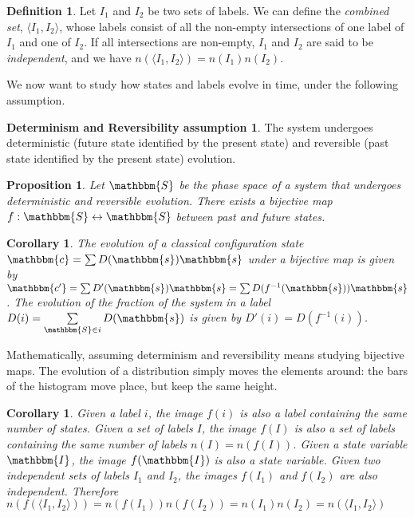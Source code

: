 \documentclass[aps,pra,10pt,twocolumn,floatfix,nofootinbib]{revtex4-1}
\newtheorem{cor}[thm]{Corollary}
\newtheorem{prop}[thm]{Proposition}
\theoremstyle{definition}
\newtheorem{defn}[thm]{Definition}
\newtheorem*{assump2}{Determinism and Reversibility assumption}
\begin{document}
\begin{defn}\label{labelsCombine}
Let $I_1$ and $I_2$ be two sets of labels. We can define the \emph{combined set}, $\langle I_1, I_2 \rangle$, whose labels consist of all the non-empty intersections of one label of $I_1$ and one of $I_2$. If all intersections are non-empty, $I_1$ and $I_2$ are said to be \emph{independent}, and we have $n(\langle I_1, I_2 \rangle)=n(I_1)n(I_2)$.
\end{defn}

We now want to study how states and labels evolve in time, under the following assumption.

\begin{assump2}
The system undergoes deterministic (future state identified by the present state) and reversible (past state identified by the present state) evolution.
\end{assump2}

\begin{prop}\label{detrevMap}
Let $\mathbbm{S}$ be the phase space of a system that undergoes deterministic and reversible evolution. There exists a bijective map $f:\mathbbm{S} \leftrightarrow \mathbbm{S}$ between past and future states.
\end{prop}

\begin{cor}\label{detrevDist}
The evolution of a classical configuration state $\mathbbm{c}=\sum D(\mathbbm{s}) \mathbbm{s}$ under a bijective map is given by $\mathbbm{c'}=\sum D'(\mathbbm{s}) \mathbbm{s}=\sum D(f^{-1}(\mathbbm{s})) \mathbbm{s}$. The evolution of the fraction of the system in a label $D(i)=\sum\limits_{\mathbbm{S} \in i} D(\mathbbm{s})$ is given by $D'(i)=D(f^{-1}(i))$.
\end{cor}

Mathematically, assuming determinism and reversibility means studying bijective maps. The evolution of a distribution simply moves the elements around: the bars of the histogram move place, but keep the same height.

\begin{cor}\label{labelsCount}
Given a label $i$, the image $f(i)$ is also a label containing the same number of states. Given a set of labels $I$, the image $f(I)$ is also a set of labels containing the same number of labels $n(I) = n(f(I))$. Given a state variable $\mathbbm{I}$, the image $f(\mathbbm{I})$ is also a state variable. Given two independent sets of labels $I_1$ and $I_2$, the images $f(I_1)$ and $f(I_2)$ are also independent. Therefore $n(f(\langle I_1, I_2 \rangle))=n(f(I_1))n(f(I_2))=n(I_1)n(I_2)=n(\langle I_1, I_2 \rangle)$
\end{cor}
\end{document}
